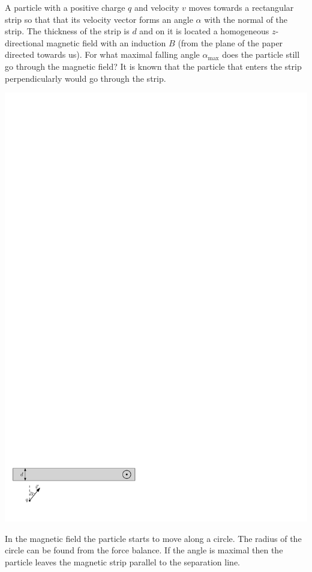 {\ifEngStatement
A particle with a positive charge $q$ and velocity $v$ moves towards a rectangular strip so that that its velocity vector forms an angle $\alpha$ with the normal of the strip. The thickness of the strip is $d$ and on it is located a homogeneous $z$-directional magnetic field with an induction $B$ (from the plane of the paper directed towards us). For what maximal falling angle $\alpha_{\mathrm{max}}$ does the particle still go through the magnetic field? It is known that the particle that enters the strip perpendicularly would go through the strip.
\begin{center}
\includegraphics[width=\linewidth]{2013-lahg-02-magnetpeegeljoonis_ipe}
\end{center}
\fi


\ifEngHint
In the magnetic field the particle starts to move along a circle. The radius of the circle can be found from the force balance. If the angle is maximal then the particle leaves the magnetic strip parallel to the separation line.
\fi


}
